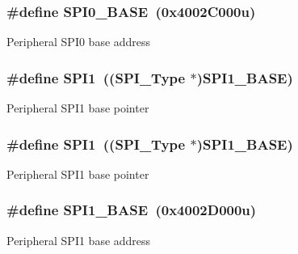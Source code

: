 \subsubsection[{\texorpdfstring{S\+P\+I0\+\_\+\+B\+A\+SE}{SPI0_BASE}}]{\setlength{\rightskip}{0pt plus 5cm}\#define S\+P\+I0\+\_\+\+B\+A\+SE~(0x4002\+C000u)}\hypertarget{group__SPI__Peripheral__Access__Layer_gadeaa49ab944c7dcae2a868b0450232c8}{}\label{group__SPI__Peripheral__Access__Layer_gadeaa49ab944c7dcae2a868b0450232c8}
Peripheral S\+P\+I0 base address 
\subsubsection[{\texorpdfstring{S\+P\+I1}{SPI1}}]{\setlength{\rightskip}{0pt plus 5cm}\#define S\+P\+I1~(({\bf S\+P\+I\+\_\+\+Type} $\ast$){\bf S\+P\+I1\+\_\+\+B\+A\+SE})}\hypertarget{group__SPI__Peripheral__Access__Layer_gad483be344a28ac800be8f03654a9612f}{}\label{group__SPI__Peripheral__Access__Layer_gad483be344a28ac800be8f03654a9612f}
Peripheral S\+P\+I1 base pointer 
\subsubsection[{\texorpdfstring{S\+P\+I1}{SPI1}}]{\setlength{\rightskip}{0pt plus 5cm}\#define S\+P\+I1~(({\bf S\+P\+I\+\_\+\+Type} $\ast$){\bf S\+P\+I1\+\_\+\+B\+A\+SE})}\hypertarget{group__SPI__Peripheral__Access__Layer_gad483be344a28ac800be8f03654a9612f}{}\label{group__SPI__Peripheral__Access__Layer_gad483be344a28ac800be8f03654a9612f}
Peripheral S\+P\+I1 base pointer 
\subsubsection[{\texorpdfstring{S\+P\+I1\+\_\+\+B\+A\+SE}{SPI1_BASE}}]{\setlength{\rightskip}{0pt plus 5cm}\#define S\+P\+I1\+\_\+\+B\+A\+SE~(0x4002\+D000u)}\hypertarget{group__SPI__Peripheral__Access__Layer_ga50cd8b47929f18b05efbd0f41253bf8d}{}\label{group__SPI__Peripheral__Access__Layer_ga50cd8b47929f18b05efbd0f41253bf8d}
Peripheral S\+P\+I1 base address 
